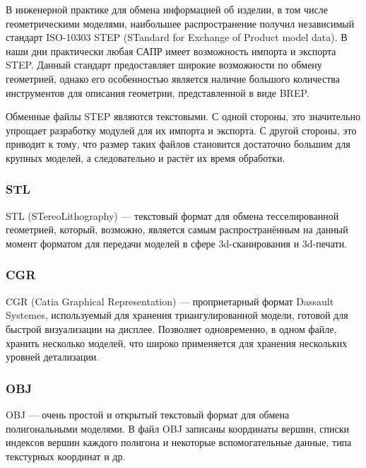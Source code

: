 В инженерной практике для обмена информацией об изделии, в том числе геометрическими моделями, наибольшее распространение получил независимый стандарт ISO-10303 STEP (STandard for Exchange of Product model data). В наши дни практически любая САПР имеет возможность импорта и экспорта STEP.
Данный стандарт предоставляет широкие возможности по обмену геометрией, однако его особенностью является наличие большого количества инструментов для описания геометрии, представленной в виде BREP.

Обменные файлы STEP являются текстовыми. С одной стороны, это значительно упрощает разработку модулей для их импорта и экспорта. С другой стороны, это приводит к тому, что размер таких файлов становится достаточно большим для крупных моделей, а следовательно и растёт их время обработки.

\subsubsection{STL}\label{sec:secSTL}

STL (STereoLithography) --- текстовый формат для обмена тесселированной геометрией, который, возможно, является самым распространённым на данный момент форматом для передачи моделей в сфере 3d-сканирования и 3d-печати.

\subsubsection{CGR}\label{sec:secCGR}


CGR (Catia Graphical Representation) --- проприетарный формат Dassault Systemes, используемый для хранения триангулированной модели, готовой для быстрой визуализации на дисплее.
Позволяет одновременно, в одном файле, хранить несколько моделей, что широко применяется для хранения нескольких уровней детализации.

\subsubsection{OBJ}\label{sec:secOBJ}

OBJ --- очень простой и открытый текстовый формат для обмена полигональными моделями. В файл OBJ записаны координаты вершин, списки индексов вершин каждого полигона и некоторые вспомогательные данные, типа текстурных координат и др.

